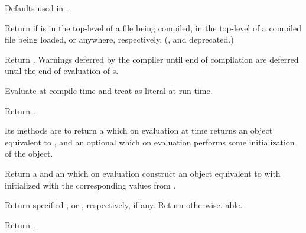 \begin{LIST}{1cm}
  {
  Defaults used in .
  }

  {
  Return  if
   is in the top-level of a file being compiled, in the
  top-level of a compiled file being loaded, or anywhere,
  respectively. (,  and  deprecated.)
  }

  {
  Return . Warnings deferred by the
  compiler until end of compilation are deferred until the end of
  evaluation of s. 
  }

  {
  Evaluate  at compile time and treat  as
  literal at run time. 
  }

  {
  Return .
  }

  {
  Its methods are to return a  which on
  evaluation at  time returns an object equivalent to
  , and an optional  which on
  evaluation performs some initialization of the object. 
  }

  {
  Return a  and an  which on evaluation construct an object equivalent to
   with  initialized with the corresponding values
  from . 
  }

  {
  Return specified , or , respectively, if any. Return \retval{\NIL}
  otherwise. able. 
  }
  
  {
  Return .
  }

\end{LIST}


